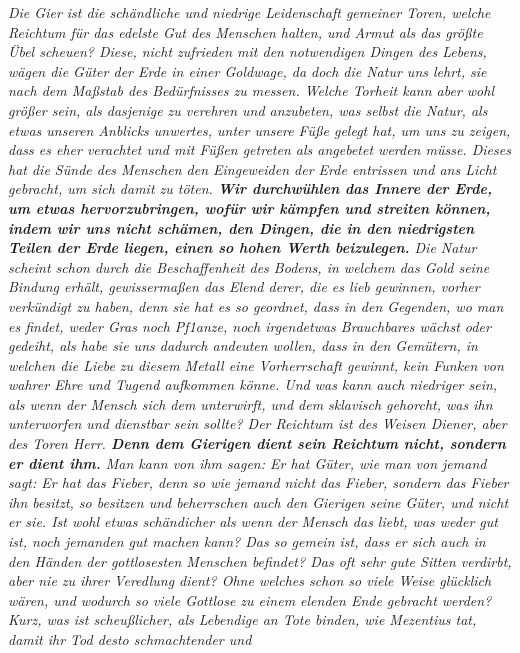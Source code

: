 \textit{Die Gier ist die schändliche und niedrige Leidenschaft gemeiner Toren,
welche
Reichtum für das edelste Gut des Menschen halten, und Armut als das größte
Übel scheuen? Diese, nicht zufrieden mit den notwendigen Dingen des Lebens,
wägen die Güter der Erde in einer Goldwage, da doch die Natur uns lehrt, sie
nach dem Maßstab des Bedürfnisses zu messen. Welche Torheit kann aber wohl
größer sein, als dasjenige zu verehren und anzubeten, was selbst die Natur, als
etwas unseren Anblicks unwertes, unter unsere Füße gelegt hat, um uns zu
zeigen, dass es eher verachtet und mit Füßen getreten als angebetet werden müsse.
Dieses hat die Sünde des Menschen den Eingeweiden der Erde entrissen und ans
Licht gebracht, um sich damit zu töten. \label{ref:13_21_Kapitalisten_kritik}
\textbf{Wir durchwühlen das Innere der
Erde, um
etwas hervorzubringen, wofür wir kämpfen und streiten können, indem wir uns
nicht schämen, den Dingen, die in den niedrigsten Teilen der Erde liegen, einen
so hohen Werth beizulegen.} Die Natur scheint schon durch die Beschaffenheit des
Bodens, in welchem das Gold seine Bindung erhält, gewissermaßen das Elend derer,
die es lieb gewinnen, vorher verkündigt zu haben, denn sie hat es so geordnet,
dass in den Gegenden, wo man es findet, weder Gras noch Pf1anze, noch irgendetwas Brauchbares 
wächst oder gedeiht, als habe sie uns dadurch andeuten
wollen, dass in den Gemütern, in welchen die Liebe zu diesem Metall eine
Vorherrschaft gewinnt, kein Funken von wahrer Ehre und Tugend aufkommen könne.
Und was kann auch niedriger sein, als wenn der Mensch sich dem unterwirft, und
dem sklavisch gehorcht, was ihn unterworfen und dienstbar sein sollte? Der
Reichtum ist des Weisen Diener, aber des Toren Herr.
\label{ref:13_21_Kapitalisten_dienerschaft} \textbf{Denn dem Gierigen dient
sein Reichtum nicht, sondern er dient ihm.} Man kann von ihm sagen: Er hat
Güter, wie man von jemand sagt: Er hat das Fieber, denn so wie jemand nicht das
Fieber, sondern das Fieber ihn besitzt, so besitzen und beherrschen auch den
Gierigen seine Güter, und nicht er sie. Ist wohl etwas schändicher als wenn der
Mensch das liebt, was weder gut ist, noch jemanden gut machen kann? Das so
gemein ist, dass er sich auch in den Händen der gottlosesten Menschen befindet?
Das oft sehr gute Sitten verdirbt, aber nie zu ihrer Veredlung dient? Ohne
welches schon so viele Weise glücklich wären, und wodurch so viele Gottlose zu
einem elenden Ende gebracht werden? Kurz, was ist scheußlicher, als Lebendige an
Tote binden, wie Mezentius tat, damit ihr Tod desto
schmachtender und
}
